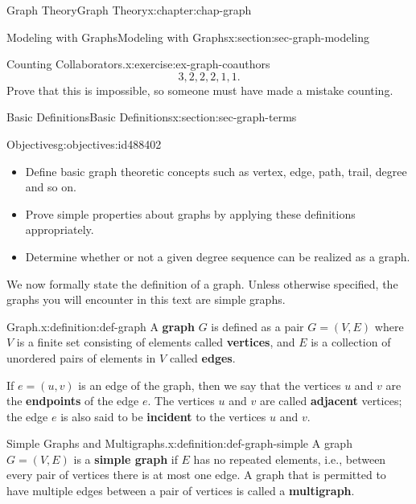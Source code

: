 \documentclass[oneside,10pt,]{book}
\newcommand{\terminology}[1]{\textbf{#1}}
\numberwithin{equation}{section}
\begin{document}
\begin{chapterptx}{Graph Theory}{}{Graph Theory}{}{}{x:chapter:chap-graph}
\begin{sectionptx}{Modeling with Graphs}{}{Modeling with Graphs}{}{}{x:section:sec-graph-modeling}
\begin{inlineexercise}{Counting Collaborators.}{x:exercise:ex-graph-coauthors}
\begin{equation*}
3,2,2,2,1,1\text{.}
\end{equation*}
Prove that this is impossible, so someone must have made a mistake counting.%
\end{inlineexercise}
\end{sectionptx}
%
%
\typeout{************************************************}
\typeout{************************************************}
%
\begin{sectionptx}{Basic Definitions}{}{Basic Definitions}{}{}{x:section:sec-graph-terms}
\begin{objectives}{Objectives}{g:objectives:id488402}
%
\begin{itemize}[label=\textbullet]
\item{}Define basic graph theoretic concepts such as vertex, edge, path, trail, degree and so on.%
\item{}Prove simple properties about graphs by applying these definitions appropriately.%
\item{}Determine whether or not a given degree sequence can be realized as a graph.%
\end{itemize}
\end{objectives}
We now formally state the definition of a graph. Unless otherwise specified, the graphs you will encounter in this text are simple graphs.%
\begin{definition}{Graph.}{x:definition:def-graph}%
A \terminology{graph} \(G\) is defined as a pair \(G = (V,E)\) where \(V\) is a finite set consisting of elements called \terminology{vertices}, and \(E\) is a collection of unordered pairs of elements in \(V\) called \terminology{edges}.%
\par
If \(e = (u,v)\) is an edge of the graph, then we say that the vertices \(u\) and \(v\) are the \terminology{endpoints} of the edge \(e\). The vertices \(u\) and \(v\) are called \terminology{adjacent} vertices; the edge \(e\) is also said to be \terminology{incident} to the vertices \(u\) and \(v\).%
\end{definition}
\begin{definition}{Simple Graphs and Multigraphs.}{x:definition:def-graph-simple}%
A graph \(G = (V,E)\) is a \terminology{simple graph} if \(E\) has no repeated elements, i.e.\@, between every pair of vertices there is at most one edge. A graph that is permitted to have multiple edges between a pair of vertices is called a \terminology{multigraph}.%
\end{definition}

\end{sectionptx}
\end{chapterptx}
\end{document}
